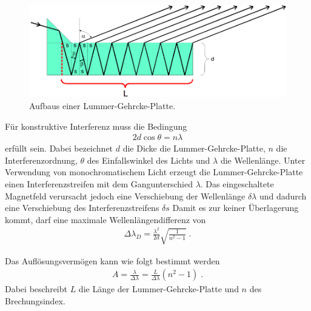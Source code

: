 \begin{figure}[H]
  \centering
  \includegraphics[width=.75\textwidth]{ressources/Platte.png}
  \caption{Aufbaus einer Lummer-Gehrcke-Platte\cite{skript}.}
  \label{fig:aufbau_2}
\end{figure}

Für konstruktive Interferenz muss die Bedingung
\begin{align}
	2d\cos{\theta}=n\lambda
\end{align}
erfüllt sein. Dabei bezeichnet $d$ die Dicke die Lummer-Gehrcke-Platte, $n$ die Interferenzordnung, $\theta$ des Einfallswinkel des Lichts und $\lambda$ die Wellenlänge.
Unter Verwendung von monochromatischem Licht erzeugt die Lummer-Gehrcke-Platte einen Interferenzstreifen mit dem Gangunterschied $\lambda$. Das eingeschaltete Magnetfeld verursacht jedoch eine Verschiebung der Wellenlänge $\delta \lambda$ und dadurch eine Verschiebung des Interferenzstreifens $\delta s$
Damit es zur keiner Überlagerung kommt, darf eine maximale Wellenlängendifferenz von
\begin{align}
	\Delta \lambda_D=\frac{\lambda^2}{2d}\sqrt{\frac{1}{n^2-1}}\;.
\end{align}

Das Auflösungsvermögen kann wie folgt bestimmt werden
\begin{align}
	A=\frac{\lambda}{\Delta\lambda}=\frac{L}{\Delta \lambda}(n^2-1)\;.
\end{align}
Dabei beschreibt $L$ die Länge der Lummer-Gehrcke-Platte und $n$ des Brechungsindex.